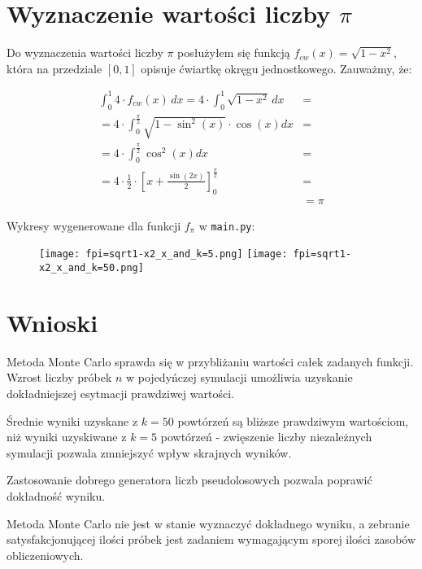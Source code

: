 \documentclass{article}
\begin{document}
\section{Wyznaczenie wartości liczby \(\pi\)}

Do wyznaczenia wartości liczby \(\pi\) posłużyłem się funkcją $f_{cw}(x)=\sqrt{1-x^2}$, która na przedziale $[0,1]$ opisuje ćwiartkę okręgu jednostkowego.
Zauważmy, że:

\begin{align}
    \int_{0}^{1} 4\cdot f_{cw}(x)\, dx = 4 \cdot \int_{0}^{1}\sqrt{1-x^2}\, dx &=\\
    = 4 \cdot \int_{0}^{\frac{\pi}{2}} \sqrt{1-\sin^2(x)} \cdot \cos(x) dx &=\\
    = 4 \cdot \int_{0}^{\frac{\pi}{2}} \cos^2(x) dx &=\\
    = 4 \cdot \frac{1}{2} \cdot \left[x + \frac{\sin(2x)}{2} \right]_{0}^{\frac{\pi}{2}} &=\\
    &= \pi
\end{align}

Wykresy wygenerowane dla funkcji $f_{\pi}$ w \texttt{main.py}:

\begin{figure}[H]
    \texttt{[image: fpi=sqrt1-x2\_x\_and\_k=5.png]}
    \texttt{[image: fpi=sqrt1-x2\_x\_and\_k=50.png]}
\end{figure}

\section{Wnioski}

Metoda Monte Carlo sprawda się w przybliżaniu wartości całek zadanych funkcji. Wzrost liczby próbek $n$ w pojedyńczej symulacji umożliwia uzyskanie dokładniejszej esytmacji prawdziwej wartości.

Średnie wyniki uzyskane z $k=50$ powtórzeń są bliższe prawdziwym wartościom, niż wyniki uzyskiwane z $k=5$ powtórzeń - zwięszenie liczby niezależnych symulacji pozwala zmniejszyć wpływ skrajnych wyników. 

Zastosowanie dobrego generatora liczb pseudolosowych pozwala poprawić dokładność wyniku. 

Metoda Monte Carlo nie jest w stanie wyznaczyć dokładnego wyniku, a zebranie satysfakcjonującej ilości próbek jest zadaniem wymagającym sporej ilości zasobów obliczeniowych.
\end{document}
